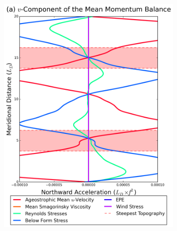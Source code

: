 \documentclass[12pt,a4paper]{report}
\begin{document}
 
 \begin{figure}
 	\centering
 	\begin{subfigure}{0.46\linewidth}
 		\centering
 		\includegraphics[width=\linewidth ]{vmom_3}
 		\label{fig:vmomlayer3}
 	\end{subfigure}
 	\quad
 	\begin{subfigure}{0.46\linewidth}
 		\centering

\end{subfigure}
\end{figure}
\end{document}
